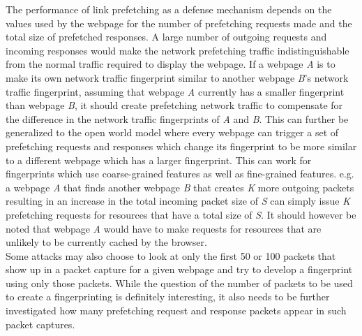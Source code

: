The performance of link prefetching as a defense mechanism depends on the values used by the webpage for the number of prefetching requests made and the total size of prefetched responses. 
A large number of outgoing requests and incoming responses would make the network prefetching traffic indistinguishable from the normal traffic required to display the webpage.
If a webpage \textit{A} is to make its own network traffic fingerprint similar to another webpage  \textit{B}'s network traffic fingerprint, assuming that webpage \textit{A} currently has a smaller fingerprint than webpage \textit{B}, it should create prefetching network traffic to compensate for the difference in the network traffic fingerprints of \textit{A} and \textit{B}. 
This can further be generalized to the open world model where every webpage can trigger a set of prefetching requests and responses which change its fingerprint to be more similar to a different webpage which has a larger fingerprint. 
This can work for fingerprints which use coarse-grained features as well as fine-grained features.
e.g. a webpage \textit{A} that finds another webpage \textit{B} that creates \textit{K} more outgoing packets resulting in an increase in the total incoming packet size of \textit{S} can simply issue \textit{K} prefetching requests for resources that have a total size of \textit{S}. 
It should however be noted that webpage \textit{A} would have to make requests for resources that are unlikely to be currently cached by the browser.\\
Some attacks may also choose to look at only the first 50 or 100 packets that show up in a packet capture for a given webpage and try to develop a fingerprint using only those packets. 
While the question of the number of packets to be used to create a fingerprinting is definitely interesting, it also needs to be further investigated how many prefetching request and response packets appear in such packet captures. 
